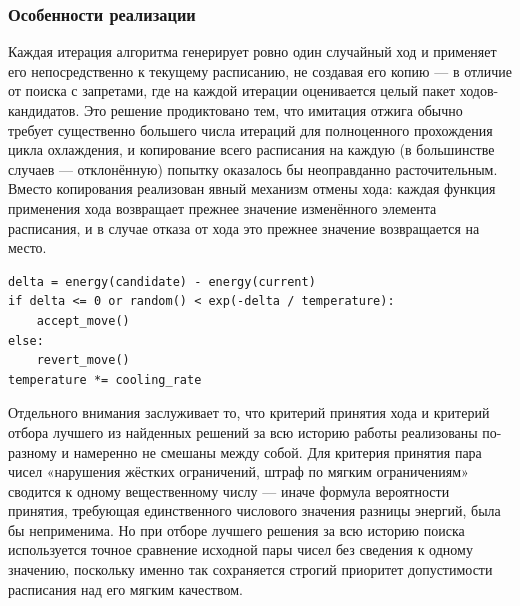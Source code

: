 \subsubsection{ Особенности реализации}

Каждая итерация алгоритма генерирует ровно один случайный ход и применяет его непосредственно к текущему расписанию, не создавая его копию — в отличие от поиска с запретами, где на каждой итерации оценивается целый пакет ходов-кандидатов. Это решение продиктовано тем, что имитация отжига обычно требует существенно большего числа итераций для полноценного прохождения цикла охлаждения, и копирование всего расписания на каждую (в большинстве случаев — отклонённую) попытку оказалось бы неоправданно расточительным. Вместо копирования реализован явный механизм отмены хода: каждая функция применения хода возвращает прежнее значение изменённого элемента расписания, и в случае отказа от хода это прежнее значение возвращается на место.

\begin{verbatim}
delta = energy(candidate) - energy(current)
if delta <= 0 or random() < exp(-delta / temperature):
    accept_move()
else:
    revert_move()
temperature *= cooling_rate
\end{verbatim}

Отдельного внимания заслуживает то, что критерий принятия хода и критерий отбора лучшего из найденных решений за всю историю работы реализованы по-разному и намеренно не смешаны между собой. Для критерия принятия пара чисел «нарушения жёстких ограничений, штраф по мягким ограничениям» сводится к одному вещественному числу — иначе формула вероятности принятия, требующая единственного числового значения разницы энергий, была бы неприменима. Но при отборе лучшего решения за всю историю поиска используется точное сравнение исходной пары чисел без сведения к одному значению, поскольку именно так сохраняется строгий приоритет допустимости расписания над его мягким качеством.

